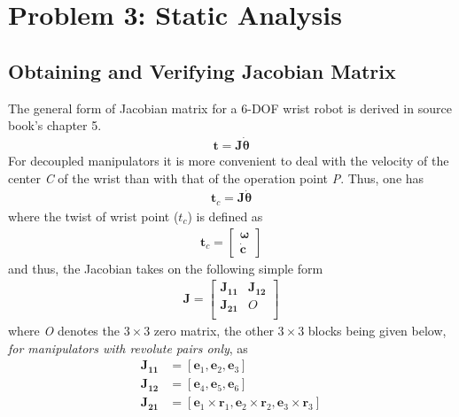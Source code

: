 \documentclass[conference]{IEEEtran}
\begin{document}
\section{Problem 3: Static Analysis}

\subsection{Obtaining and Verifying Jacobian Matrix}
The general form of Jacobian matrix for a 6-DOF wrist robot is derived in source book's \cite{b1} chapter 5.
\begin{align}
    \mathbf{t} = \mathbf{J} \mathbf{\dot{\theta}}
\end{align}
For decoupled manipulators it is more convenient to deal with the velocity of the center \textit{C} of the wrist than with that of the operation point \textit{P}. Thus, one has
\begin{align}
    \mathbf{t}_c = \mathbf{J} \mathbf{\dot{\theta}}
\end{align}
where the twist of wrist point ($t_c$) is defined as
\begin{align}
    \mathbf{t}_c = \begin{bmatrix}
                       \mathbf{\omega} \\
                       \mathbf{\dot{c}}
                   \end{bmatrix}
\end{align}
and thus, the Jacobian takes on the following simple form
\begin{align}
    \mathbf{J} = \begin{bmatrix}
                     \mathbf{J_{11}} & \mathbf{J_{12}}     \\
                     \mathbf{J_{21}} & \mathbf{\mathit{O}} \\
                 \end{bmatrix}
\end{align}
where \textit{O} denotes the $3 \times 3$ zero matrix, the other $3 \times 3$ blocks being given below, \textit{for manipulators with revolute pairs only}, as
\begin{align}
    \mathbf{J_{11}} & = \left[\mathbf{e}_1, \mathbf{e}_2, \mathbf{e}_3\right]                                                             \\
    \mathbf{J_{12}} & = \left[\mathbf{e}_4, \mathbf{e}_5, \mathbf{e}_6\right]                                                             \\
    \mathbf{J_{21}} & = \left[\mathbf{e}_1 \times \mathbf{r}_1, \mathbf{e}_2 \times \mathbf{r}_2, \mathbf{e}_3 \times \mathbf{r}_3\right]
\end{align}
\end{document}
